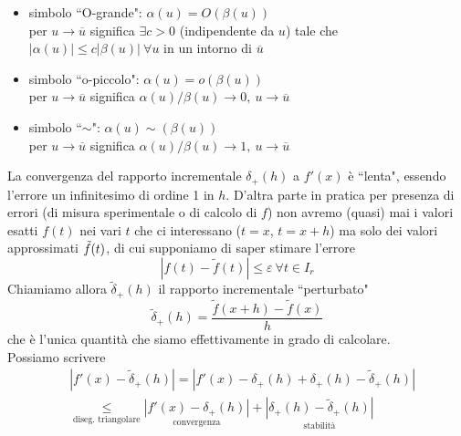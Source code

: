 \begin{itemize}
    \item simbolo ``O-grande": $\alpha(u)=O(\beta(u))$ \\
    per $u \rightarrow \overline{u}$ significa $\exists c > 0$ (indipendente da $u$) tale che $|\alpha(u)| \leq c|\beta(u)| \ \forall u$ in un intorno di $\overline{u}$ 
    \item simbolo ``o-piccolo": $\alpha(u)=o(\beta(u))$ \\
    per $u \rightarrow \overline{u}$ significa $\alpha(u) / \beta(u) \rightarrow 0, \ u \rightarrow \overline{u}$
    \item simbolo ``$\sim$": $\alpha(u)\sim(\beta(u))$ \\
    per $u \rightarrow \overline{u}$ significa $\alpha(u) / \beta(u) \rightarrow 1, \ u \rightarrow \overline{u}$
\end{itemize}
La convergenza del rapporto incrementale $\delta_+(h)$ a $f'(x)$ è ``lenta", essendo l'errore un infinitesimo di ordine 1 in $h$.
\newline
D'altra parte in pratica per presenza di errori (di misura sperimentale o di calcolo di $f$) non avremo (quasi) mai i valori esatti $f(t)$ nei vari $t$ che ci interessano ($t=x$, $t=x+h$) ma solo dei valori approssimati $\Tilde{f}(t)$, di cui supponiamo di saper stimare l'errore
\begin{equation*}
    |f(t) - \tilde{f}(t)| \leq \varepsilon \ \forall t \in I_r
\end{equation*}
Chiamiamo allora $\tilde{\delta}_+(h)$ il rapporto incrementale ``perturbato"
\begin{equation*}
    \tilde{\delta}_+(h) = \frac{\tilde{f}(x+h)-\tilde{f}(x)}{h}
\end{equation*}
che è l'unica quantità che siamo effettivamente in grado di calcolare.\\
Possiamo scrivere
\begin{equation*}
    \begin{split}
        & |f'(x)-\tilde{\delta}_+(h)| = |f'(x)-\delta_+(h)+\delta_+(h)-\tilde{\delta}_+(h)| \\
        & \underset{\text{diseg. triangolare}}{\leq} \underset{\text{convergenza}}{|f'(x)-\delta_+(h)|} + \underset{\text{stabilità}}{|\delta_+(h)-\tilde{\delta}_+(h)|}
    \end{split}
\end{equation*}
